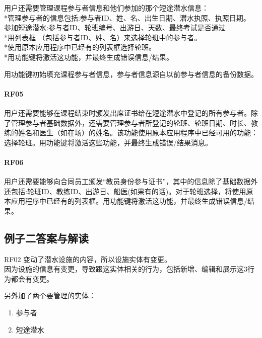 用户还需要管理课程参与者信息和他们参加的那个短途潜水信息：\\
*管理参与者的信息包括:参与者ID、姓、名、出生日期、潜水执照、执照日期。\\
参加短途潜水:参与者ID、轮班编号、出游日、天数、最终考试是否通过\\
*用列表框 （包括参与者ID、姓、名）来选择轮班中的参与者。\\
*使用原本应用程序中已经有的列表框选择轮班。\\
*用功能键将激活这功能，并最终生成错误信息/结果。

用功能键初始填充课程参与者信息，参与者信息源自以前参与者信息的备份数据。

\hypertarget{rf05-1}{%
\paragraph{RF05}\label{rf05-1}}

用户还需要能够在课程结束时颁发出席证书给在短途潜水中登记的所有参与者。除了管理参与者基础数据外，还需要管理参与者所登记的轮班、轮班日期、时长、教练的姓名和医生（如在场）的姓名。该功能使用原本应用程序中已经可用的功能：选择轮班。用功能键将激活这些功能，并最终生成错误/结果消息。

\hypertarget{rf06}{%
\paragraph{RF06}\label{rf06}}

用户还需要能够向合同员工颁发``教员身份参与证书''，其中的信息除了基础数据外还包括:轮班ID、教练ID、出游日、船医(如果有的话)。对于轮班选择，将使用原本应用程序中已经有的列表框。用功能键将激活这功能，并最终生成错误信息/结果。

\hypertarget{ux4f8bux5b50ux4e8cux7b54ux6848ux4e0eux89e3ux8bfb}{%
\subsection{例子二答案与解读}\label{ux4f8bux5b50ux4e8cux7b54ux6848ux4e0eux89e3ux8bfb}}

RF02 变动了潜水设施的内容，所以设施实体有变更。\\
因为设施的信息有变更，导致跟这实体相关的行为，包括新增、编辑和展示这3行为都会有变更。

另外加了两个要管理的实体：

\begin{enumerate}
\tightlist
\item
  参与者
\item
  短途潜水
\end{enumerate}

